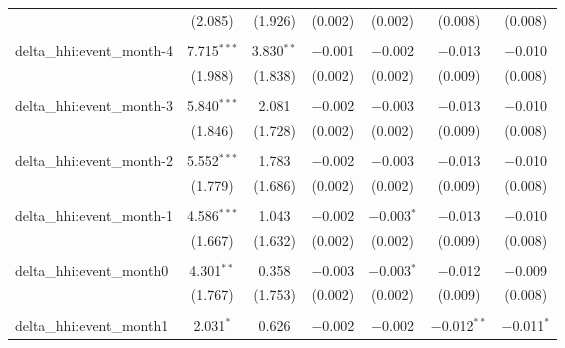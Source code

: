 \begin{table}[H]
{\begin{tabular}{@{\extracolsep{5pt}}lcccccc}
   & (2.085) & (1.926) & (0.002) & (0.002) & (0.008) & (0.008) \\  

   & & & & & & \\  

  delta\_hhi:event\_month-4 & 7.715$^{***}$ & 3.830$^{**}$ & $-$0.001 & $-$0.002 & $-$0.013 & $-$0.010 \\  

   & (1.988) & (1.838) & (0.002) & (0.002) & (0.009) & (0.008) \\  

   & & & & & & \\  

  delta\_hhi:event\_month-3 & 5.840$^{***}$ & 2.081 & $-$0.002 & $-$0.003 & $-$0.013 & $-$0.010 \\  

   & (1.846) & (1.728) & (0.002) & (0.002) & (0.009) & (0.008) \\  

   & & & & & & \\  

  delta\_hhi:event\_month-2 & 5.552$^{***}$ & 1.783 & $-$0.002 & $-$0.003 & $-$0.013 & $-$0.010 \\  

   & (1.779) & (1.686) & (0.002) & (0.002) & (0.009) & (0.008) \\  

   & & & & & & \\  

  delta\_hhi:event\_month-1 & 4.586$^{***}$ & 1.043 & $-$0.002 & $-$0.003$^{*}$ & $-$0.013 & $-$0.010 \\  

   & (1.667) & (1.632) & (0.002) & (0.002) & (0.009) & (0.008) \\  

   & & & & & & \\  

  delta\_hhi:event\_month0 & 4.301$^{**}$ & 0.358 & $-$0.003 & $-$0.003$^{*}$ & $-$0.012 & $-$0.009 \\  

   & (1.767) & (1.753) & (0.002) & (0.002) & (0.009) & (0.008) \\  

   & & & & & & \\  

  delta\_hhi:event\_month1 & 2.031$^{*}$ & 0.626 & $-$0.002 & $-$0.002 & $-$0.012$^{**}$ & $-$0.011$^{*}$ \\  


\end{tabular}}
\end{table}
